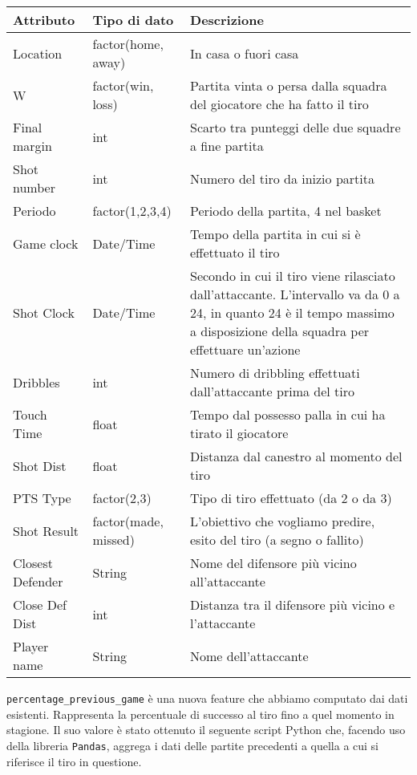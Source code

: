 \begin{center}
\begin{longtable}[m]{|m{8em} m{7em} m{16em}|}
		\hline
		\bfseries{Attributo} & \bfseries{Tipo di dato} & \bfseries{Descrizione} \\
		\hline
		Location & factor(home, away) & In casa o fuori casa \\
		\hline
		W & factor(win, loss) & Partita vinta o persa dalla squadra del giocatore che ha fatto il tiro \\ 
		\hline
		Final margin & int & Scarto tra punteggi delle due squadre a fine partita \\ 
		\hline
		Shot number & int & Numero del tiro da inizio partita \\ 
		\hline
		Periodo & factor(1,2,3,4) & Periodo della partita, 4 nel basket \\ 
		\hline
		Game clock & Date/Time & Tempo della partita in cui si è effettuato il tiro \\ 
		\hline
		Shot Clock & Date/Time & Secondo in cui il tiro viene rilasciato dall’attaccante. L’intervallo va da 0 a 24, in quanto 24 è il tempo massimo a disposizione della squadra per effettuare un’azione \\ 
		\hline
		Dribbles & int & Numero di dribbling effettuati dall’attaccante prima del tiro \\ 
		\hline
		Touch Time & float & Tempo dal possesso palla in cui ha tirato il giocatore \\ 
		\hline
		Shot Dist & float & Distanza dal canestro al momento del tiro \\ 
		\hline
		PTS Type & factor(2,3) & Tipo di tiro effettuato (da 2 o da 3) \\ 
		\hline
		Shot Result & factor(made, missed) & L’obiettivo che vogliamo predire, esito del tiro (a segno o fallito) \\ 
		\hline
		Closest Defender & String & Nome del difensore più vicino all’attaccante \\ 
		\hline
		Close Def Dist & int & Distanza tra il difensore più vicino e l’attaccante \\ 
		\hline
		Player name & String & Nome dell’attaccante \\ 
		\hline
	\end{longtable}
\end{center}

\texttt{percentage\_previous\_game} è una nuova feature che abbiamo computato dai dati esistenti. Rappresenta la percentuale di successo al tiro fino a quel momento in stagione. Il suo valore è stato ottenuto il seguente script Python che, facendo uso della libreria \texttt{Pandas}, aggrega i dati delle partite precedenti a quella a cui si riferisce il tiro in questione.

